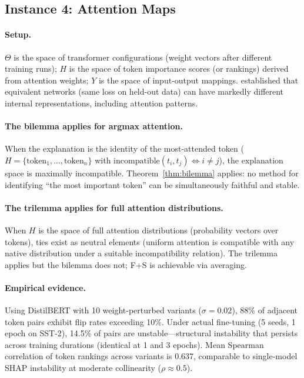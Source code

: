 \documentclass{article}
\begin{document}
\subsection{Instance 4: Attention Maps}
\label{sec:attention}

\paragraph{Setup.}
$\Theta$ is the space of transformer configurations (weight vectors after
different training runs);
$H$ is the space of token importance scores (or rankings) derived from
attention weights;
$Y$ is the space of input-output mappings.
\citet{damour2022underspecification} established that equivalent networks
(same loss on held-out data) can have markedly different internal
representations, including attention patterns.

\paragraph{The bilemma applies for argmax attention.}
When the explanation is the identity of the most-attended token
($H = \{\text{token}_1, \ldots, \text{token}_n\}$ with
$\mathrm{incompatible}(t_i, t_j) \Leftrightarrow i \neq j$),
the explanation space is maximally incompatible.
Theorem~\ref{thm:bilemma} applies: no method for identifying ``the most
important token'' can be simultaneously faithful and stable.

\paragraph{The trilemma applies for full attention distributions.}
When $H$ is the space of full attention distributions (probability vectors
over tokens), ties exist as neutral elements (uniform attention is
compatible with any native distribution under a suitable incompatibility
relation).
The trilemma applies but the bilemma does not; F+S is achievable via
averaging.

\paragraph{Empirical evidence.}
Using DistilBERT with 10 weight-perturbed variants ($\sigma = 0.02$),
88\% of adjacent token pairs exhibit flip rates exceeding 10\%.
Under actual fine-tuning (5 seeds, 1 epoch on SST-2), 14.5\% of pairs
are unstable---structural instability that persists across training
durations (identical at 1 and 3 epochs).
Mean Spearman correlation of token rankings across variants is 0.637,
comparable to single-model SHAP instability at moderate collinearity
($\rho \approx 0.5$).





\end{document}

